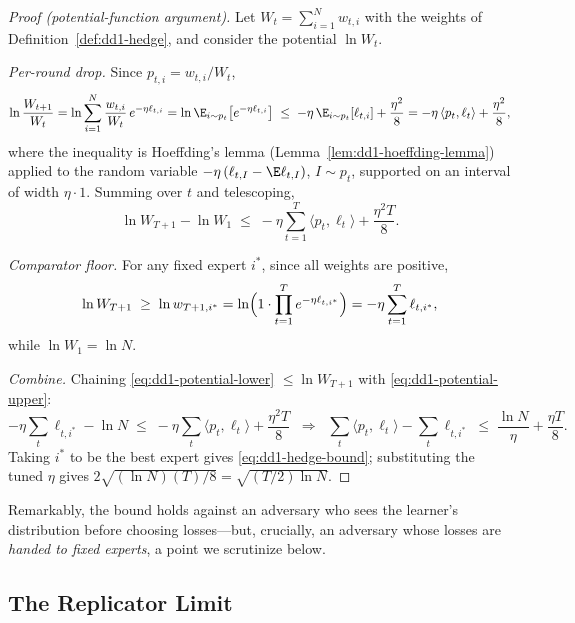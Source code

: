 \begin{proof}[Proof (potential-function argument)]
Let $W_t = \sum_{i=1}^N w_{t,i}$ with the weights of
Definition~\ref{def:dd1-hedge}, and consider the potential $\ln W_t$.

\emph{Per-round drop.} Since $p_{t,i} = w_{t,i} / W_t$,
\[
\ln \frac{W_{t+1}}{W_t}
= \ln \sum_{i=1}^N \frac{w_{t,i}}{W_t}\, e^{-\eta \ell_{t,i}}
= \ln \E_{i \sim p_t}\bigl[ e^{-\eta \ell_{t,i}} \bigr]
\;\le\; -\eta\, \E_{i \sim p_t}[\ell_{t,i}] + \frac{\eta^2}{8}
= -\eta\, \langle p_t, \ell_t \rangle + \frac{\eta^2}{8},
\]
where the inequality is Hoeffding's lemma
(Lemma~\ref{lem:dd1-hoeffding-lemma}) applied to the random variable
$-\eta\,(\ell_{t,I} - \E\ell_{t,I})$, $I \sim p_t$, supported on an interval
of width $\eta \cdot 1$. Summing over $t$ and telescoping,
\begin{equation}
\label{eq:dd1-potential-upper}
\ln W_{T+1} - \ln W_1
\;\le\; -\eta \sum_{t=1}^T \langle p_t, \ell_t \rangle + \frac{\eta^2 T}{8}.
\end{equation}

\emph{Comparator floor.} For any fixed expert $i^*$, since all weights are
positive,
\begin{equation}
\label{eq:dd1-potential-lower}
\ln W_{T+1} \;\ge\; \ln w_{T+1, i^*}
= \ln\Bigl( 1 \cdot \prod_{t=1}^T e^{-\eta \ell_{t, i^*}} \Bigr)
= -\eta \sum_{t=1}^T \ell_{t, i^*},
\end{equation}
while $\ln W_1 = \ln N$.

\emph{Combine.} Chaining \eqref{eq:dd1-potential-lower} $\le \ln W_{T+1}$
with \eqref{eq:dd1-potential-upper}:
\[
-\eta \sum_t \ell_{t, i^*} - \ln N
\;\le\; -\eta \sum_t \langle p_t, \ell_t \rangle + \frac{\eta^2 T}{8}
\;\;\Longrightarrow\;\;
\sum_t \langle p_t, \ell_t \rangle - \sum_t \ell_{t, i^*}
\;\le\; \frac{\ln N}{\eta} + \frac{\eta T}{8}.
\]
Taking $i^*$ to be the best expert gives \eqref{eq:dd1-hedge-bound};
substituting the tuned $\eta$ gives
$2\sqrt{(\ln N)(T)/8} = \sqrt{(T/2)\ln N}$.
\end{proof}

Remarkably, the bound holds against an adversary who sees the learner's
distribution before choosing losses---but, crucially, an adversary whose
losses are \emph{handed to fixed experts}, a point we scrutinize below.

\subsection{The Replicator Limit}

